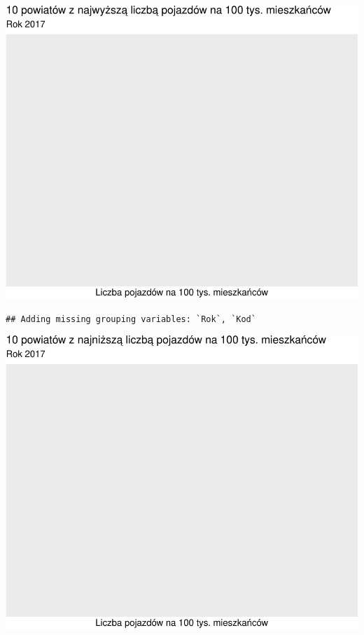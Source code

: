\documentclass[
]{article}
\begin{document}
\begin{flushleft}\includegraphics{raport_wypadki_files/figure-latex/unnamed-chunk-36-1} \end{flushleft}

\begin{verbatim}
## Adding missing grouping variables: `Rok`, `Kod`
\end{verbatim}

\begin{flushleft}\includegraphics{raport_wypadki_files/figure-latex/unnamed-chunk-37-1} \end{flushleft}
\end{document}
